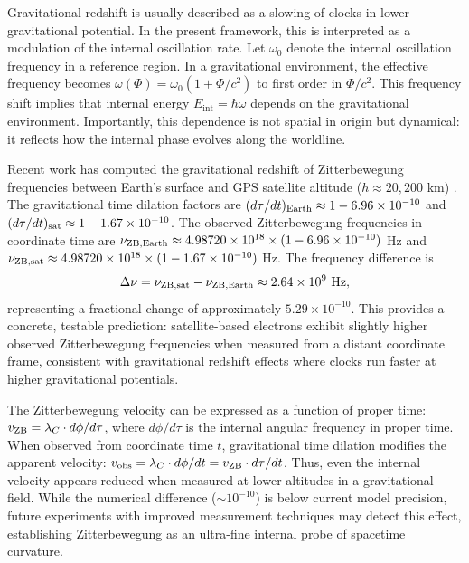\documentclass[%
 reprint,
 amsmath,amssymb,
 aps,
 prb,
]{revtex4-2}
\numberwithin{equation}{section}
\begin{document}
Gravitational redshift is usually described as a slowing of clocks in lower gravitational potential. In the present framework, this is interpreted as a modulation of the internal oscillation rate. Let $\omega_0$ denote the internal oscillation frequency in a reference region. In a gravitational environment, the effective frequency becomes $\omega(\Phi) = \omega_0 (1 + \Phi/c^2)$ to first order in $\Phi/c^2$. This frequency shift implies that internal energy $E_{\text{int}} = \hbar \omega$ depends on the gravitational environment. Importantly, this dependence is not spatial in origin but dynamical: it reflects how the internal phase evolves along the worldline.

Recent work has computed the gravitational redshift of Zitterbewegung frequencies between Earth's surface and GPS satellite altitude ($h \approx 20{,}200$ km) \cite{Hanamura2025GravRedshift}. The gravitational time dilation factors are $(d\tau/dt)_{\rm Earth} \approx 1 - 6.96 \times 10^{-10}$ and $(d\tau/dt)_{\rm sat} \approx 1 - 1.67 \times 10^{-10}$. The observed Zitterbewegung frequencies in coordinate time are $\nu_{\rm ZB,Earth} \approx 4.98720 \times 10^{18} \times (1 - 6.96 \times 10^{-10})$ Hz and $\nu_{\rm ZB,sat} \approx 4.98720 \times 10^{18} \times (1 - 1.67 \times 10^{-10})$ Hz. The frequency difference is
\begin{equation}
\Delta\nu = \nu_{\rm ZB,sat} - \nu_{\rm ZB,Earth} \approx 2.64 \times 10^9 \text{ Hz},
\label{eq:frequency_difference}
\end{equation}
representing a fractional change of approximately $5.29 \times 10^{-10}$. This provides a concrete, testable prediction: satellite-based electrons exhibit slightly higher observed Zitterbewegung frequencies when measured from a distant coordinate frame, consistent with gravitational redshift effects where clocks run faster at higher gravitational potentials.

The Zitterbewegung velocity can be expressed as a function of proper time: $v_{\rm ZB} = \lambda_C \cdot d\phi/d\tau$, where $d\phi/d\tau$ is the internal angular frequency in proper time. When observed from coordinate time $t$, gravitational time dilation modifies the apparent velocity: $v_{\rm obs} = \lambda_C \cdot d\phi/dt = v_{\rm ZB} \cdot d\tau/dt$. Thus, even the internal velocity appears reduced when measured at lower altitudes in a gravitational field. While the numerical difference ($\sim 10^{-10}$) is below current model precision, future experiments with improved measurement techniques may detect this effect, establishing Zitterbewegung as an ultra-fine internal probe of spacetime curvature.
\end{document}
